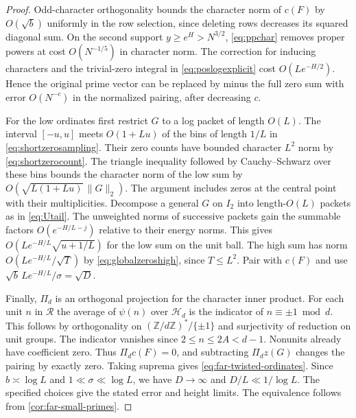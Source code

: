 \documentclass[11pt,a4paper]{article}
\numberwithin{equation}{section}
\begin{document}
\begin{proof}
Odd-character orthogonality bounds the character norm of $c(F)$
by $O(\sqrt b)$ uniformly in the row selection, since deleting
rows decreases its squared diagonal sum. On the second support
$y\ge e^H>N^{3/2}$, \eqref{eq:ppchar} removes proper powers at
cost $O(N^{-1/5})$ in character norm. The correction for inducing
characters and the trivial-zero integral in \eqref{eq:poslogexplicit}
cost $O(L e^{-H/2})$. Hence the original prime vector can be
replaced by minus the full zero sum with error $O(N^{-c})$ in
the normalized pairing, after decreasing $c$.

For the low ordinates first restrict $G$ to a log packet of
length $O(L)$. The interval $[-u,u]$ meets $O(1+Lu)$ of the bins
of length $1/L$ in \eqref{eq:shortzerosampling}. Their zero counts
have bounded character $L^2$ norm by \eqref{eq:shortzerocount}.
The triangle inequality followed by Cauchy--Schwarz over these
bins bounds the character norm of the low sum by
$O(\sqrt{L(1+Lu)}\,\|G\|_2)$. The argument includes zeros at
the central point with their multiplicities. Decompose a general
$G$ on $I_2$ into length-$O(L)$ packets as in \eqref{eq:Utail}.
The unweighted norms of successive packets gain the summable
factors $O(e^{-H/L-j})$ relative to their energy norms. This
gives $O(Le^{-H/L}\sqrt{u+1/L})$ for the low sum on the unit
ball. The high sum has norm $O(Le^{-H/L}/\sqrt T)$ by
\eqref{eq:globalzeroshigh}, since $T\le L^2$.
Pair with $c(F)$ and use
$\sqrt b\,Le^{-H/L}/\sigma=\sqrt D$.

Finally, $\Pi_d$ is an orthogonal projection for the character
inner product. For each unit $n$ in $\mathcal R$ the average of
$\psi(n)$ over $\mathcal H_d$ is the indicator of
$n\equiv\pm1\bmod d$. This follows by orthogonality on
$(\mathbb Z/d\mathbb Z)^*/\{\pm1\}$ and surjectivity of
reduction on unit groups. The indicator vanishes since
$2\le n\le2A<d-1$. Nonunits already have coefficient zero.
Thus $\Pi_d c(F)=0$, and subtracting $\Pi_d z(G)$ changes the
pairing by exactly zero. Taking suprema gives
\eqref{eq:far-twisted-ordinates}. Since $b\asymp\log L$ and
$1\ll\sigma\ll\log L$, we have $D\to\infty$ and
$D/L\ll1/\log L$. The specified choices give the stated error
and height limits. The equivalence follows from
\cref{cor:far-small-primes}.


\end{proof}
\end{document}
